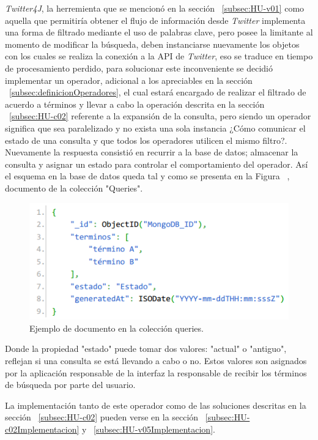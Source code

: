 \textit{Twitter4J}, la herremienta que se mencionó en la sección ~\ref{subsec:HU-v01} como aquella que permitiría obtener el flujo de información desde \textit{Twitter} implementa una forma de filtrado mediante el uso de palabras clave, pero posee la limitante al momento de modificar la búsqueda, deben instanciarse nuevamente los objetos con los cuales se realiza la conexión a la API de \textit{Twitter}, eso se traduce en tiempo de procesamiento perdido, para solucionar este inconveniente se decidió implementar un operador, adicional a los apreciables en la sección ~\ref{subsec:definicionOperadores}, el cual estará encargado de realizar el filtrado de acuerdo a términos y llevar a cabo la operación descrita en la sección ~\ref{subsec:HU-c02} referente a la expansión de la consulta, pero siendo un operador significa que sea paralelizado y no exista una sola instancia ¿Cómo comunicar el estado de una consulta y que todos los operadores utilicen el mismo filtro?.\\

Nuevamente la respuesta consistió en recurrir a la base de datos; almacenar la consulta y asignar un estado para controlar el comportamiento del operador. Así el esquema en la base de datos queda tal y como se presenta en la Figura ~, documento de la colección "Queries".

\begin{figure}[H]
	\centering
	\captionsetup{justification=centering}
	\includegraphics[scale=0.8]{images/Query.png}
	\caption[Ejemplo de documento en la colección queries.]{Ejemplo de documento en la colección queries.}
	\label{fig:esquemaQuery}
\end{figure}

Donde la propiedad "estado" puede tomar dos valores: "actual" o "antiguo", reflejan si una consulta se está llevando a cabo o no. Estos valores son asignados por la aplicación responsable de la interfaz la responsable de recibir los términos de búsqueda por parte del usuario.

La implementación tanto de este operador como de las soluciones descritas en la sección ~\ref{subsec:HU-c02} pueden verse en la sección ~\ref{subsec:HU-c02Implementacion} y ~\ref{subsec:HU-v05Implementacion}.











